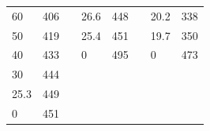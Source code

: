 \documentclass{article}
\begin{document}
\begin{table}[!ht]
\begin{tabular}{|l|l|l|l|l|l|l|l|}
60                     & 406               &                 & 26.6                   & 448               &                 & 20.2                   & 338               \\ \cline{1-2} \cline{4-5} \cline{7-8}
50                     & 419               &                 & 25.4                   & 451               &                 & 19.7                   & 350               \\ \cline{1-2} \cline{4-5} \cline{7-8}
40                     & 433               &                 & 0                      & 495               &                 & 0                      & 473               \\ \cline{1-2} \cline{4-5} \cline{7-8}
30                     & 444               &                 &                        &                   &                 &                        &                   \\ \cline{1-2} \cline{4-5} \cline{7-8}
25.3                   & 449               &                 &                        &                   &                 &                        &                   \\ \cline{1-2} \cline{4-5} \cline{7-8}
0                      & 451               &                 &                        &                   &                 &                        &                   \\ \cline{1-2} \cline{4-5} \cline{7-8}
\end{tabular}
\end{table}
\end{document}
